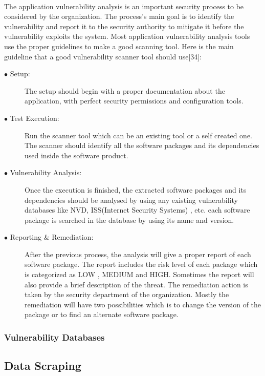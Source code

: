 \paragraph{}
The application vulnerability analysis is an important security process to be considered by the organization. The process's main goal is to identify the vulnerability and report it to the security authority to mitigate it before the vulnerability exploits the system. Most application vulnerability analysis tools use the proper guidelines to make a good scanning tool. Here is the main guideline that a good vulnerability scanner tool should use[34]:
\begin{description}
	\item [$\bullet$ Setup:] The setup should begin with a proper documentation about the application, with perfect security permissions and configuration tools.
	
	\item [$\bullet$ Test Execution:] Run the scanner tool which can be an existing tool or a self created one. The scanner should identify all the software packages and its dependencies used inside the software product.
	
	\item [$\bullet$ Vulnerability Analysis:] Once the execution is finished, the extracted software packages and its dependencies should be analysed by using any existing vulnerability databases like NVD, ISS(Internet Security Systems) , etc. each software package is searched in the database by using its name and version.
	
	\item [$\bullet$ Reporting \& Remediation:] After the previous process, the analysis will give a proper report of each software package. The report includes the risk level of each package which is categorized as LOW , MEDIUM and  HIGH. Sometimes the report will also provide a brief description of the threat. The remediation action is taken by the security department of the organization. Mostly the remediation will have two possibilities which is to change the version of the package or to find an alternate software package.
\end{description}
\subsubsection{Vulnerability Databases}

\subsection{Data Scraping}
